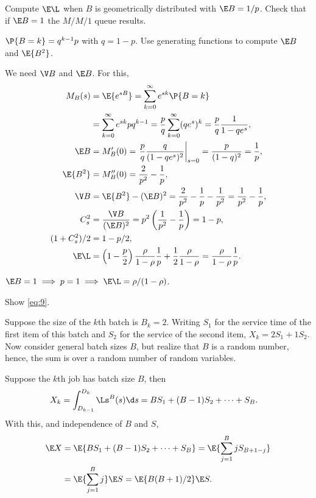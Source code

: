 \begin{exercise}\label{ex:l-168}
Compute $\E\L$ when $B$ is geometrically distributed with $\E B =  1/p$. Check that if $\E B =1$ the $M/M/1$ queue results.
\begin{hint}
$\P{B=k}=q^{k-1}p$ with $q=1-p$. Use generating functions to compute $\E B$ and $\E{B^2}$.
\end{hint}
\begin{solution}
 We need $\V B$ and $\E B$. For this,
 \begin{align*}
 M_B(s)
&= \E{e^{sB}} = \sum_{k=0}^\infty e^{sk} \P{B=k} \\
&= \sum_{k=0}^\infty e^{sk} p q^{k-1}
= \frac p q \sum_{k=0}^\infty (q e^s)^k = \frac p q \frac1{1-qe^s},\\
 \E B &= M_B'(0) = \left.\frac p q \frac q{(1-q e^s)^2}\right|_{s=0}= \frac p{(1-q)^2} = \frac 1 p,\\
 \E{B^2} &= M_B''(0) = \frac2{p^2} - \frac1p, \\
 \V B &= \E{B^2} - (\E B)^2 = \frac2{p^2} - \frac1p - \frac1{p^2} = \frac1{p^2}-\frac1p,\\
 C_s^2&= \frac{\V B}{(\E B)^2} = p^2 \left(\frac1{p^2}-\frac1p\right)=1-p,\\
 (1+C_s^2)/2 &= 1-p/2,\\
 \E \L &=
\left(1-\frac p2\right) \frac\rho{1-\rho} \frac 1 p + \frac12\frac\rho{1-\rho}
=\frac\rho{1-\rho} \frac 1 p.
\end{align*}

$\E B = 1 \implies p = 1 \implies \E\L=\rho/(1-\rho)$.
\end{solution}
\end{exercise}


\begin{exercise}\label{ex:99}
Show
\cref{eq:9}.
\begin{hint}
  Suppose the size of the $k$th batch is $B_k = 2$.
  Writing $S_1$ for the service time of the first item of this batch and $S_2$ for the service of the second item,  $X_k = 2 S_1 + 1 S_2$.
  Now consider general batch sizes $B$, but realize that $B$ is a random number, hence, the sum is  over a random number of random variables.
\end{hint}
\begin{solution}
 Suppose the $k$th job has batch size $B$, then
  \begin{align*}
    X_k &= \int_{D_{k-1}}^{D_k} \Ls^B(s) \d s
    = B S_1 + (B-1)S_2 + \cdots + S_B.
  \end{align*}
  With this, and independence of $B$ and $S$,
  \begin{align*}
    \E X & = \E{B S_1 + (B-1)S_2 + \cdots+ S_B} = \E{\sum_{j=1}^B j S_{B+1-j}} \\
    &= \E{\sum_{j=1}^B j} \E S = \E{B(B+1)/2} \E S.
  \end{align*}
\end{solution}
\end{exercise}


